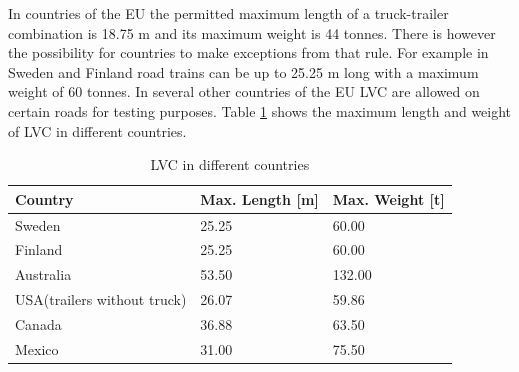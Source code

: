 \documentclass[ExampleMasters.tex]{subfiles}
\begin{document}
In countries of the EU the permitted maximum length of a truck-trailer combination is 18.75 m and its maximum weight is 44 tonnes. There is however the possibility for countries to make exceptions from that rule.\cite{96/53/EC}  For example in Sweden and Finland road trains can be up to 25.25 m long with a  maximum weight of 60 tonnes.\cite{Vaegverket}
In several other countries of the EU LVC are allowed on certain roads for testing purposes. 
Table \ref{tab:LVC_in_different_countries} shows the maximum length and weight of LVC in different countries.

\begin{table}[h]
	\centering
	\caption{LVC in different countries\cite{Vaegverket}\cite{LVC_Australia}\Cite{LVC_USA}\cite{LVC_Canada}\Cite{LVC_Mexico}}
	\label{tab:LVC_in_different_countries}
	\begin{tabular}{l|l|l|}
		Country   & Max. Length [m] & Max. Weight [t] \\ \hline
		Sweden    &       25.25      &       60.00      \\
		Finland   &            25.25 &         60.00    \\
		Australia &      53.50       &           132.00  \\
		USA(trailers without truck)&      26.07       &    59.86        \\
		Canada & 36.88 & 63.50 \\
		Mexico & 31.00 & 75.50 \\
	\end{tabular} \\
\end{table}
\end{document}
